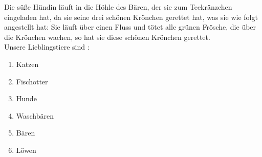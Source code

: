 \documentclass{scrartcl}
\begin{document}
 
Die süße Hündin läuft in die Höhle des Bären, der sie zum Teekränzchen eingeladen hat, da sie seine drei schönen Krönchen gerettet hat, was sie wie folgt angestellt hat: Sie läuft über einen Fluss und tötet alle grünen Frösche, die über die Krönchen wachen, so hat sie diese schönen Krönchen gerettet.\\
\smallskip 						%
Unsere Lieblingstiere sind : 
\begin{enumerate}
	\item Katzen
	\item Fischotter
	\item Hunde
	\item Waschbären
	\item Bären
	\item Löwen 
\end {enumerate}
\end{document}
